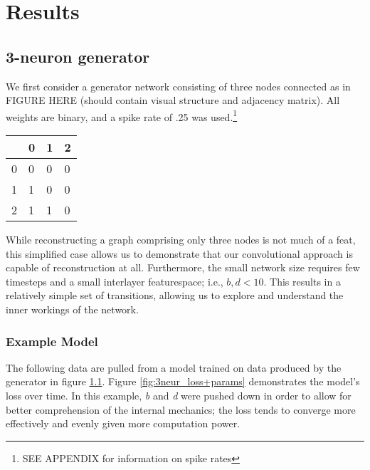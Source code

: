 \graphicspath{ {resources/models/3neurEx/9/} {resources/models/3neurEx/weights/} 
} 

\chapter{Results}
\label{results}
\section{3-neuron generator}
\label{results_3neur}
We first consider a generator network consisting of three nodes connected as in 
FIGURE HERE (should contain visual structure and adjacency matrix). All weights 
are binary, and a spike rate of .25 was used.\footnote{SEE APPENDIX	for 
information on spike rates}

\begin{table}[h]
	\centering
	
	\hspace{2em}
	\begin{tabular}{l|lll}
		  & 0 & 1 & 2\\
		\hline
		0 & 0 & 0 & 0\\
		1 & 1 & 0 & 0\\
		2 & 1 & 1 & 0
	\end{tabular}
	\label{fig:2simplex+adjacency}
\end{table}

While reconstructing a graph comprising only three nodes is not much of a feat, 
this simplified case allows us to demonstrate that our convolutional approach is 
capable of reconstruction at all. Furthermore, the small network size requires 
few timesteps and a small interlayer featurespace; i.e., $b,d<10$. This results 
in a relatively simple set of transitions, allowing us to explore and understand 
the inner workings of the network.

\subsection{Example Model}
\label{subsec:3neurex}
The following data are pulled from a model trained on data produced by the 
generator in figure \ref{fig:2simplex+adjacency}. Figure 
\ref{fig:3neur_loss+params} demonstrates the model's loss over time. In this 
example, \textit{b} and \textit{d} were pushed down in order to allow for better 
comprehension of the internal mechanics; the loss tends to converge more 
effectively and evenly given more computation power.


